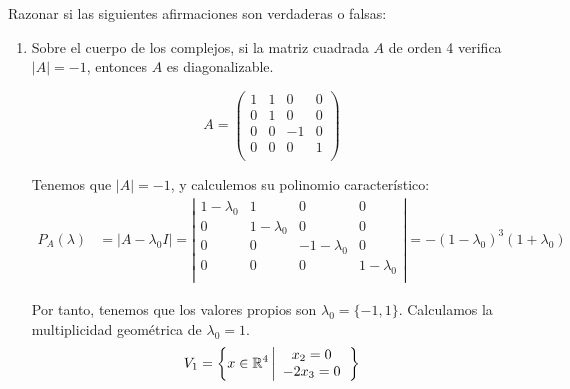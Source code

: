 \documentclass[12pt]{article}
\begin{document}
\vspace{1cm}

\begin{ejercicio} [4 ptos]
    Razonar si las siguientes afirmaciones son verdaderas o falsas:
    \begin{enumerate}
        \item Sobre el cuerpo de los complejos, si la matriz cuadrada $A$ de orden 4 verifica $|A|=-1$, entonces $A$ es diagonalizable.

        \begin{equation*}
            A=\left( \begin{array}{cccc}
                1 & 1 & 0 & 0 \\
                0 & 1 & 0 & 0 \\
                0 & 0 & -1 & 0 \\
                0 & 0 & 0 & 1 \\
            \end{array}\right)
        \end{equation*}

        Tenemos que $|A|=-1$, y calculemos su polinomio característico:
        \begin{equation*}\begin{split}
            P_{A}(\lambda) & = |A-\lambda_0 I| = \left| \begin{array}{cccc}
                1-\lambda_0 & 1 & 0 & 0 \\
                0 & 1-\lambda_0 & 0 & 0 \\
                0 & 0 & -1-\lambda_0 & 0 \\
                0 & 0 & 0 & 1-\lambda_0 \\
            \end{array}\right|
            =
            -(1-\lambda_0)^3(1+\lambda_0)
        \end{split}\end{equation*}

        Por tanto, tenemos que los valores propios son $\lambda_0=\{-1, 1\}$. Calculamos la multiplicidad geométrica de $\lambda_0=1$.
        \begin{equation*}
            V_{1} = \left\{x\in\mathbb{R}^4 \left| \begin{array}{c}
                 x_2=0  \\
                 -2x_3=0 \\
            \end{array}\right.\right\}
        \end{equation*}


\end{enumerate}
\end{ejercicio}
\end{document}
